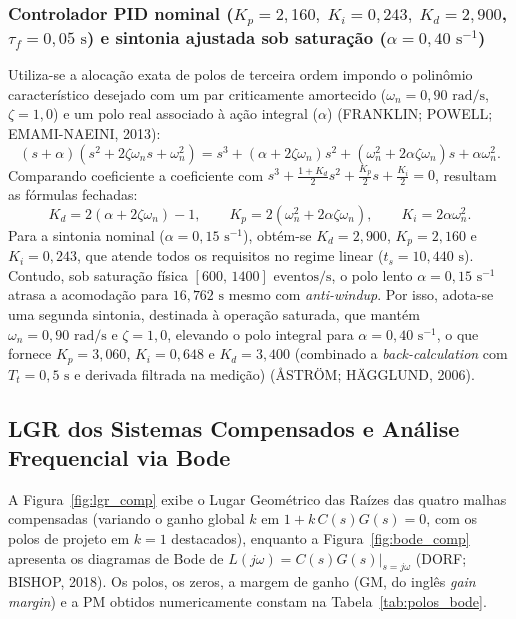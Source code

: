\subsubsection[Controlador PID nominal e sintonia ajustada ($\alpha = 0{,}40\text{ s}^{-1}$)]{Controlador PID nominal ($K_p = 2{,}160,\; K_i = 0{,}243,\; K_d = 2{,}900$, $\tau_f = 0{,}05\text{ s}$) e sintonia ajustada sob saturação ($\alpha = 0{,}40\text{ s}^{-1}$)}
Utiliza-se a alocação exata de polos de terceira ordem impondo o polinômio característico desejado com um par criticamente amortecido ($\omega_n = 0{,}90\text{ rad/s}$, $\zeta = 1{,}0$) e um polo real associado à ação integral ($\alpha$) (FRANKLIN; POWELL; EMAMI-NAEINI, 2013):
\begin{equation}
    (s + \alpha)(s^2 + 2\zeta\omega_n s + \omega_n^2) = s^3 + (\alpha + 2\zeta\omega_n)s^2 + (\omega_n^2 + 2\alpha\zeta\omega_n)s + \alpha\omega_n^2.
\end{equation}
Comparando coeficiente a coeficiente com $s^3 + \frac{1+K_d}{2}s^2 + \frac{K_p}{2}s + \frac{K_i}{2} = 0$, resultam as fórmulas fechadas:
\begin{equation}
    K_d = 2(\alpha + 2\zeta\omega_n) - 1, \qquad
    K_p = 2(\omega_n^2 + 2\alpha\zeta\omega_n), \qquad
    K_i = 2\alpha\omega_n^2.
\end{equation}
Para a sintonia nominal ($\alpha = 0{,}15\text{ s}^{-1}$), obtém-se $K_d = 2{,}900$, $K_p = 2{,}160$ e $K_i = 0{,}243$, que atende todos os requisitos no regime linear ($t_s = 10{,}440\text{ s}$). Contudo, sob saturação física $[600,\,1400]\text{ eventos/s}$, o polo lento $\alpha = 0{,}15\text{ s}^{-1}$ atrasa a acomodação para $16{,}762\text{ s}$ mesmo com \textit{anti-windup}. Por isso, adota-se uma segunda sintonia, destinada à operação saturada, que mantém $\omega_n = 0{,}90\text{ rad/s}$ e $\zeta = 1{,}0$, elevando o polo integral para $\alpha = 0{,}40\text{ s}^{-1}$, o que fornece $K_p = 3{,}060$, $K_i = 0{,}648$ e $K_d = 3{,}400$ (combinado a \textit{back-calculation} com $T_t = 0{,}5\text{ s}$ e derivada filtrada na medição) (ÅSTRÖM; HÄGGLUND, 2006).

\subsection{LGR dos Sistemas Compensados e Análise Frequencial via Bode}\label{sec:lgr_bode}
A Figura~\ref{fig:lgr_comp} exibe o Lugar Geométrico das Raízes das quatro malhas compensadas (variando o ganho global $k$ em $1 + k\,C(s)G(s) = 0$, com os polos de projeto em $k=1$ destacados), enquanto a Figura~\ref{fig:bode_comp} apresenta os diagramas de Bode de $L(j\omega) = C(s)G(s)|_{s=j\omega}$ (DORF; BISHOP, 2018). Os polos, os zeros, a margem de ganho ($\mathrm{GM}$, do inglês \textit{gain margin}) e a $\mathrm{PM}$ obtidos numericamente constam na Tabela~\ref{tab:polos_bode}.

